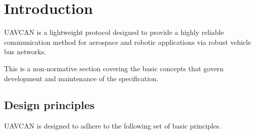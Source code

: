 \chapter{Introduction}\label{sec:introduction}

UAVCAN is a lightweight protocol designed to provide a highly reliable communication method for
aerospace and robotic applications via robust vehicle bus networks.

This is a non-normative section covering the basic concepts that govern development and maintenance of the specification.

\section{Design principles}

UAVCAN is designed to adhere to the following set of basic principles.

